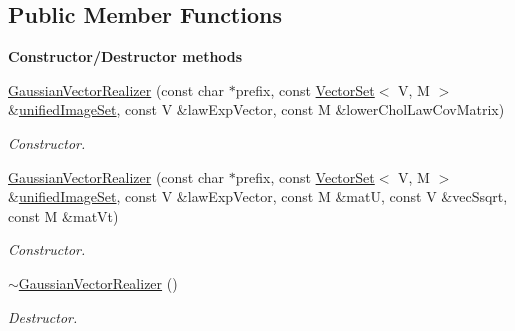 \subsection*{Public Member Functions}
\begin{Indent}{\bf Constructor/\-Destructor methods}\par
\begin{DoxyCompactItemize}
\item 
\hyperlink{class_q_u_e_s_o_1_1_gaussian_vector_realizer_a853058669a791085bf60362042820601}{Gaussian\-Vector\-Realizer} (const char $\ast$prefix, const \hyperlink{class_q_u_e_s_o_1_1_vector_set}{Vector\-Set}$<$ V, M $>$ \&\hyperlink{class_q_u_e_s_o_1_1_base_vector_realizer_ad958991bab8d6369e8a0d66b22a237d4}{unified\-Image\-Set}, const V \&law\-Exp\-Vector, const M \&lower\-Chol\-Law\-Cov\-Matrix)
\begin{DoxyCompactList}\small\item\em Constructor. \end{DoxyCompactList}\item 
\hyperlink{class_q_u_e_s_o_1_1_gaussian_vector_realizer_afea143de20a365e82a846ccb208b841b}{Gaussian\-Vector\-Realizer} (const char $\ast$prefix, const \hyperlink{class_q_u_e_s_o_1_1_vector_set}{Vector\-Set}$<$ V, M $>$ \&\hyperlink{class_q_u_e_s_o_1_1_base_vector_realizer_ad958991bab8d6369e8a0d66b22a237d4}{unified\-Image\-Set}, const V \&law\-Exp\-Vector, const M \&mat\-U, const V \&vec\-Ssqrt, const M \&mat\-Vt)
\begin{DoxyCompactList}\small\item\em Constructor. \end{DoxyCompactList}\item 
\hyperlink{class_q_u_e_s_o_1_1_gaussian_vector_realizer_a06b3de43f945bb00c51fa289313f5fe4}{$\sim$\-Gaussian\-Vector\-Realizer} ()
\begin{DoxyCompactList}\small\item\em Destructor. \end{DoxyCompactList}\end{DoxyCompactItemize}
\end{Indent}

